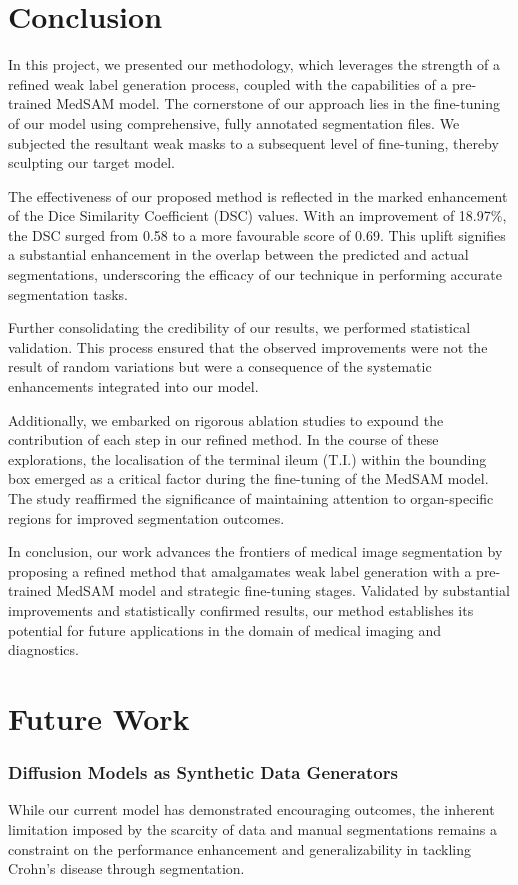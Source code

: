 \section{Conclusion}

In this project, we presented our methodology, which leverages the strength of a refined weak label generation process, coupled with the capabilities of a pre-trained MedSAM model. The cornerstone of our approach lies in the fine-tuning of our model using comprehensive, fully annotated segmentation files. We subjected the resultant weak masks to a subsequent level of fine-tuning, thereby sculpting our target model.

The effectiveness of our proposed method is reflected in the marked enhancement of the Dice Similarity Coefficient (DSC) values. With an improvement of 18.97\%, the DSC surged from 0.58 to a more favourable score of 0.69. This uplift signifies a substantial enhancement in the overlap between the predicted and actual segmentations, underscoring the efficacy of our technique in performing accurate segmentation tasks.

Further consolidating the credibility of our results, we performed statistical validation. This process ensured that the observed improvements were not the result of random variations but were a consequence of the systematic enhancements integrated into our model.

Additionally, we embarked on rigorous ablation studies to expound the contribution of each step in our refined method. In the course of these explorations, the localisation of the terminal ileum (T.I.) within the bounding box emerged as a critical factor during the fine-tuning of the MedSAM model. The study reaffirmed the significance of maintaining attention to organ-specific regions for improved segmentation outcomes.

In conclusion, our work advances the frontiers of medical image segmentation by proposing a refined method that amalgamates weak label generation with a pre-trained MedSAM model and strategic fine-tuning stages. Validated by substantial improvements and statistically confirmed results, our method establishes its potential for future applications in the domain of medical imaging and diagnostics.

\section{Future Work}

\subsubsection*{Diffusion Models as Synthetic Data Generators}
While our current model has demonstrated encouraging outcomes, the inherent limitation imposed by the scarcity of data and manual segmentations remains a constraint on the performance enhancement and generalizability in tackling Crohn's disease through segmentation.

